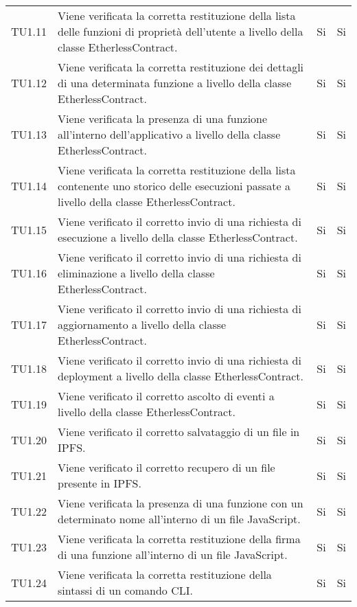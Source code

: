 \begin{longtable}{
		>{\centering}p{}
		>{}p{}
		>{\centering}p{}
		>{\centering}p{} }
		TU1.11 &
		Viene verificata la corretta restituzione della lista delle funzioni di proprietà dell’utente a livello della classe EtherlessContract. &
		Si &
		Si \tabularnewline

		TU1.12 &
		Viene verificata la corretta restituzione dei dettagli di una determinata funzione a livello della classe EtherlessContract. &
		Si &
		Si \tabularnewline

		TU1.13 &
		Viene verificata la presenza di una funzione all’interno dell’applicativo a livello della classe EtherlessContract. &
		Si &
		Si \tabularnewline

		TU1.14 &
		Viene verificata la corretta restituzione della lista contenente uno storico delle esecuzioni passate a livello della classe EtherlessContract. &
		Si &
		Si \tabularnewline

		TU1.15 &
		Viene verificato il corretto invio di una richiesta di esecuzione a livello della classe EtherlessContract. &
		Si &
		Si \tabularnewline

		TU1.16 &
		Viene verificato il corretto invio di una richiesta di eliminazione a livello della classe EtherlessContract. &
		Si &
		Si \tabularnewline

		TU1.17 &
		Viene verificato il corretto invio di una richiesta di aggiornamento a livello della classe EtherlessContract. &
		Si &
		Si \tabularnewline

		TU1.18 &
		Viene verificato il corretto invio di una richiesta di deployment\ped{\textit{G}} a livello della classe EtherlessContract. &
		Si &
		Si \tabularnewline

		TU1.19 &
		Viene verificato il corretto ascolto di eventi\ped{\textit{G}} a livello della classe EtherlessContract. &
		Si &
		Si \tabularnewline

		TU1.20 &
		Viene verificato il corretto salvataggio di un file in IPFS\ped{\textit{G}}. &
		Si &
		Si \tabularnewline

		TU1.21 &
		Viene verificato il corretto recupero di un file presente in IPFS\ped{\textit{G}}. &
		Si &
		Si \tabularnewline

		TU1.22 &
		Viene verificata la presenza di una funzione con un determinato nome all’interno di un file JavaScript\ped{\textit{G}}. &
		Si &
		Si \tabularnewline

		TU1.23 &
		Viene verificata la corretta restituzione della firma di una funzione all’interno di un file JavaScript\ped{\textit{G}}. &
		Si &
		Si \tabularnewline

		TU1.24 &
		Viene verificata la corretta restituzione della sintassi di un comando CLI\ped{\textit{G}}. &
		Si &
		Si \tabularnewline


\end{longtable}
